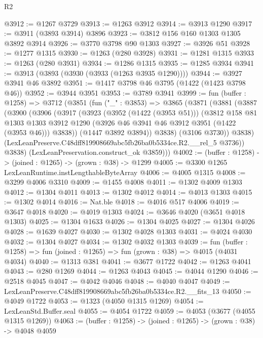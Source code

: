 \begin{lexlean}{R2}
\begin{coremodule}
@3912 := @1267 @3729
@3913 := @1263 @3912
@3914 := @3913 @1290
@3917 := @3911 (@3893 @3914) @3896
@3923 := @3812 @156 @160 @1303 @1305 @3892 @3914
@3926 := @3770 @3798 @90 @1303
@3927 := @3926 @51
@3928 := @1277 @1315
@3930 := @1263 (@280 @3928)
@3931 := @1281 @1315
@3933 := @1263 (@280 @3931)
@3934 := @1286 @1315
@3935 := @1285 @3934
@3941 := @3913 (@3893 (@3930 (@3933 (@1263 @3935 @1290))))
@3944 := @3927 @3941 @46 @3892
@3951 := @1417 @3798 @46 @3795 (@1422 (@1423 @3798 @46))
@3952 := @3944 @3951
@3953 := @3789 @3941
@3999 := fun (buffer : @1258) =>
  @3712
    (@3851
      (fun ("_" : @3853) =>
      @3865
        (@3871
          (@3881
            (@3887
              (@3900
                (@3906
                  (@3917
                    (@3923
                      (@3952 (@1422 (@3953 @51)))
                      (@3812
                        @158
                        @81
                        @1303
                        @1303
                        @3912
                        @1290
                        (@3926 @46 @3941 @46 @3912 @3951 (@1422 (@3953 @46)))
                        @3838))
                    (@1447 @3892 @3894))
                  @3838)
                (@3106 @3730))
              @3838)
            (LexLeanPreserve.C48dff819908669abc5fb26ba0b5334ce.R2.__rel_5 @3736))
          @3838)
        (LexLeanPreservation.construct_ok @3859)))
@4002 := (buffer : @1258) -> (joined : @1265) -> (grown : @38) -> @1299
@4005 := @3300 @1265 LexLeanRuntime.instLengthableByteArray
@4006 := @4005 @1315
@4008 := @3299 @4006 @3310
@4009 := @1455 @4008
@4011 := @1302 @4009 @1303
@4012 := @1304 @4011
@4013 := @1302 @4012
@4014 := @4013 @1303
@4015 := @1302 @4014
@4016 := Nat.ble
@4018 := @4016 @517 @4006
@4019 := @3647 @4018
@4020 := @4019 @1303
@4024 := @3646 @4020 (@3651 @4018 @1303)
@4025 := @1304 @1633
@4026 := @1304 @4025
@4027 := @1304 @4026
@4028 := @1639 @4027
@4030 := @1302 @4028 @1303
@4031 := @4024 @4030
@4032 := @1304 @4027
@4034 := @1302 @4032 @1303
@4039 := fun (buffer : @1258) => fun (joined : @1265) => fun (grown : @38) => @4015 (@4031 @4034)
@4040 := @1313 @381
@4041 := @3677 @1722
@4042 := @1263 @4041
@4043 := @280 @1269
@4044 := @1263 @4043
@4045 := @4044 @1290
@4046 := @2518 @4045
@4047 := @4042 @4046
@4048 := @4040 @4047
@4049 := LexLeanPreserve.C48dff819908669abc5fb26ba0b5334ce.R2.__fits_13
@4050 := @4049 @1722
@4053 := @1323 (@4050 @1315 @1269)
@4054 := LexLeanStd.Buffer.seal
@4055 := @4054 @1722
@4059 := @4053 (@3677 (@4055 @1315 @1269))
@4063 := (buffer : @1258) -> (joined : @1265) -> (grown : @38) -> @4048 @4059

\end{coremodule}
\end{lexlean}
